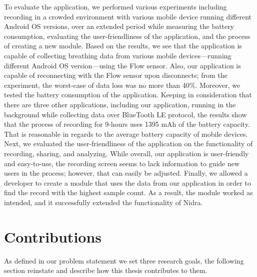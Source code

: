 To evaluate the application, we performed various experiments including recording in a crowded environment with various mobile device running different Android OS versions, over an extended period while measuring the battery consumption, evaluating the user-friendliness of the application, and the process of creating a new module. Based on the results, we see that the application is capable of collecting breathing data from various mobile devices---running different Android OS version---using the Flow sensor. Also, our application is capable of reconnecting with the Flow sensor upon disconnects; from the experiment, the worst-case of data loss was no more than 40\%. Moreover, we tested the battery consumption of the application. Keeping in consideration that there are three other applications, including our application, running in the background while collecting data over BlueTooth LE protocol, the results show that the process of recording for 9-hours uses 1395 mAh of the battery capacity. That is reasonable in regards to the average battery capacity of mobile devices. Next, we evaluated the user-friendliness of the application on the functionality of recording, sharing, and analyzing. While overall, our application is user-friendly and easy-to-use, the recording screen seems to lack information to guide new users in the process; however, that can easily be adjusted. Finally, we allowed a developer to create a module that uses the data from our application in order to find the record with the highest sample count. As a result, the module worked as intended, and it successfully extended the functionality of Nidra. 


\section{Contributions}
 As defined in our problem statement we set three research goals, the following section reinstate and describe how this thesis contributes to them.

